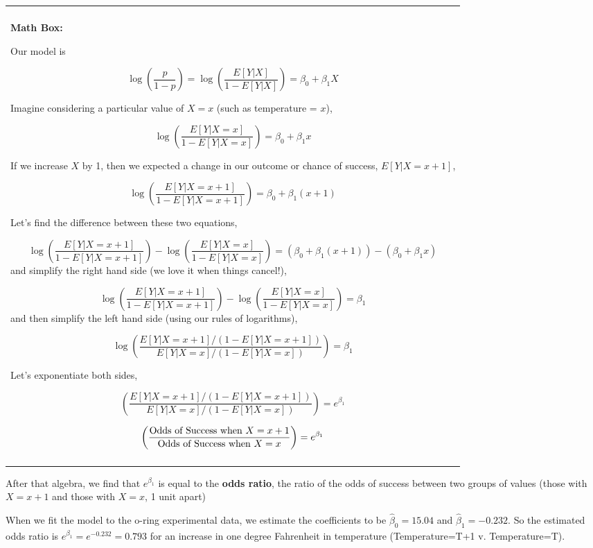 \documentclass[
]{book}
\newenvironment{Shaded}{\begin{snugshade}}{\end{snugshade}}
\newcommand{\CommentTok}[1]{\textcolor[rgb]{0.56,0.35,0.01}{\textit{#1}}}
\newcommand{\DataTypeTok}[1]{\textcolor[rgb]{0.13,0.29,0.53}{#1}}
\newcommand{\DecValTok}[1]{\textcolor[rgb]{0.00,0.00,0.81}{#1}}
\newcommand{\KeywordTok}[1]{\textcolor[rgb]{0.13,0.29,0.53}{\textbf{#1}}}
\newcommand{\NormalTok}[1]{#1}
\newcommand{\OperatorTok}[1]{\textcolor[rgb]{0.81,0.36,0.00}{\textbf{#1}}}
\newcommand{\StringTok}[1]{\textcolor[rgb]{0.31,0.60,0.02}{#1}}
\newenvironment{mathbox}
{
    \begin{center}
    
    \begin{tabular}{|p{0.8\textwidth}|}
    \rowcolor{LightYellow}
    \hline\\
    \rowcolor{LightYellow}
    \textbf{Math Box:}
}
{
    \\\rowcolor{LightYellow}
    \\\hline
    \end{tabular} 
    \end{center}
}
\begin{document}
\begin{mathbox}
Our model is

\[\log\left(\frac{p}{1-p}\right) = \log\left(\frac{E[Y|X]}{1-E[Y|X]}\right) = \beta_0 +\beta_1X\]

Imagine considering a particular value of \(X=x\) (such as temperature =
\(x\)),

\[\log\left(\frac{E[Y|X=x]}{1-E[Y|X=x]}\right) = \beta_0 +\beta_1x\]

If we increase \(X\) by 1, then we expected a change in our outcome or
chance of success, \(E[Y|X = x+1]\),

\[\log\left(\frac{E[Y|X= x+1]}{1-E[Y|X= x+1]}\right) = \beta_0 +\beta_1(x+1)\]

Let's find the difference between these two equations,

\[\log\left(\frac{E[Y|X=x+1]}{1-E[Y|X=x+1]}\right)- \log\left(\frac{E[Y|X=x]}{1-E[Y|X=x]}\right)=  (\beta_0 +\beta_1(x+1)) - ( \beta_0 +\beta_1x)\]
and simplify the right hand side (we love it when things cancel!),

\[\log\left(\frac{E[Y|X=x+1]}{1-E[Y|X=x+1]}\right)- \log\left(\frac{E[Y|X=x]}{1-E[Y|X=x]}\right)=  \beta_1\]
and then simplify the left hand side (using our rules of logarithms),

\[\log\left( \frac{E[Y|X=x+1]/(1-E[Y|X=x+1])}{E[Y|X=x]/(1-E[Y|X=x])}\right) = \beta_1\]

Let's exponentiate both sides,

\[\left( \frac{E[Y|X=x+1]/(1-E[Y|X=x+1])}{E[Y|X=x]/(1-E[Y|X=x])}\right)= e^{\beta_1}\]

\[\left( \frac{\hbox{Odds of Success when }X=x+1}{\hbox{Odds of Success when }X=x}\right)= e^{\beta_1}\]
\end{mathbox}

After that algebra, we find that \(e^{\beta_1}\) is equal to the \textbf{odds ratio}, the ratio of the odds of success between two groups of values (those with \(X=x+1\) and those with \(X=x\), 1 unit apart)

When we fit the model to the o-ring experimental data, we estimate the coefficients to be \(\hat{\beta}_0 = 15.04\) and \(\hat{\beta}_1 = -0.232\). So the estimated odds ratio is \(e^{\hat{\beta}_1} = e^{-0.232} = 0.793\) for an increase in one degree Fahrenheit in temperature (Temperature=T+1 v. Temperature=T).

\begin{Shaded}
\end{Shaded}
\end{document}
